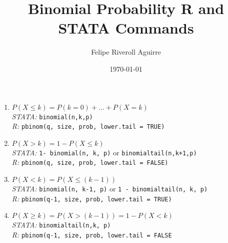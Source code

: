 \documentclass{article}
\begin{document}
\title{Binomial Probability R and STATA Commands}
\author{Felipe Riveroll Aguirre}
\date{\today}
\maketitle

\begin{enumerate}
\item 
\(P(X\leq k)=P(k=0)+...+P(X=k)\)\\
\textit{STATA: }\texttt{binomial(n,k,p)}\\
\textit{R:} \texttt{pbinom(q, size, prob, lower.tail = TRUE)}

\item

\(P(X>k) = 1 - P(X\leq k)\)\\
\textit{STATA: }\texttt{1- binomial(n, k, p)} or \texttt{binomialtail(n,k+1,p)}\\
\textit{R: }\texttt{pbinom(q, size, prob, lower.tail = FALSE)}

\item 
\(P(X<k) = P(X\leq (k-1))\)\\
\textit{STATA:} \texttt{binomial(n, k-1, p)} or \texttt{1 - binomialtail(n, k, p)}\\
\textit{R:} \texttt{pbinom(q-1, size, prob, lower.tail = TRUE)}

\item
\(P (X\geq k) = P(X>(k-1))=1-P(X<k)\)\\
\textit{STATA:} \texttt{binomialtail(n,k, p)}\\
\textit{R: }\texttt{pbinom(q-1, size, prob, lower.tail = FALSE\\ }

\end{enumerate}


\begin{center}\end{center}
\end{document}
